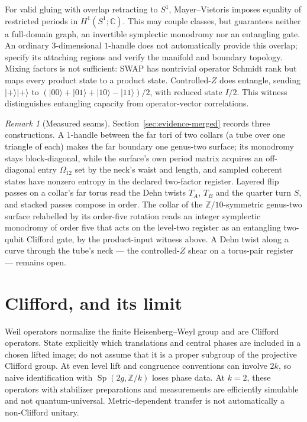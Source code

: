 \documentclass[11pt]{article}
\theoremstyle{definition}
\theoremstyle{remark}
\newtheorem{remark}[theorem]{Remark}
\newcommand{\Z}{\mathbb{Z}}
\newcommand{\C}{\mathbb{C}}
\newcommand{\Sp}{\operatorname{Sp}}
\begin{document}
For valid gluing with overlap retracting to $S^1$, Mayer--Vietoris imposes
equality of restricted periods in $H^1(S^1;\C)$. This may couple classes,
but guarantees neither a full-domain graph, an invertible symplectic
monodromy nor an entangling gate. An ordinary $3$-dimensional $1$-handle
does not automatically provide this overlap; specify its attaching regions
and verify the manifold and boundary topology.
Mixing factors is not sufficient: SWAP has nontrivial operator Schmidt rank
but maps every product state to a product state. Controlled-$Z$ does
entangle, sending $|+\rangle|+\rangle$ to
$(|00\rangle+|01\rangle+|10\rangle-|11\rangle)/2$, with reduced state $I/2$.
This witness distinguishes entangling capacity from operator-vector correlations.

\begin{remark}[Measured seams]\label{rem:seam-measured}
Section~\ref{sec:evidence-merged} records three constructions. A
$1$-handle between the far tori of two collars (a tube over one triangle
of each) makes the far boundary one genus-two surface; its monodromy stays
block-diagonal, while the surface's own period matrix acquires an
off-diagonal entry $\Omega_{12}$ set by the neck's waist and length, and
sampled coherent states have nonzero entropy in the declared two-factor
register. Layered flip passes on a collar's far torus read the Dehn twists
$T_A$, $T_B$ and the quarter turn $S$, and stacked passes compose in order.
The collar of the $\Z/10$-symmetric genus-two surface relabelled by its
order-five rotation reads an integer symplectic monodromy of order five
that acts on the level-two register as an entangling two-qubit Clifford
gate, by the product-input witness above. A Dehn twist along a curve
through the tube's neck --- the controlled-$Z$ shear on a torus-pair
register --- remains open.
\end{remark}

\section{Clifford, and its limit}\label{sec:clifford}

Weil operators normalize the finite Heisenberg--Weyl group and are
Clifford operators. State explicitly which translations and central
phases are included in a chosen lifted image; do not assume that it is a
proper subgroup of the projective Clifford group. At even level lift and
congruence conventions can involve $2k$,
so naive identification with $\Sp(2g,\Z/k)$ loses phase data. At $k=2$,
these operators with stabilizer preparations and measurements are efficiently
simulable and not quantum-universal. Metric-dependent transfer is not
automatically a non-Clifford unitary.
\end{document}
